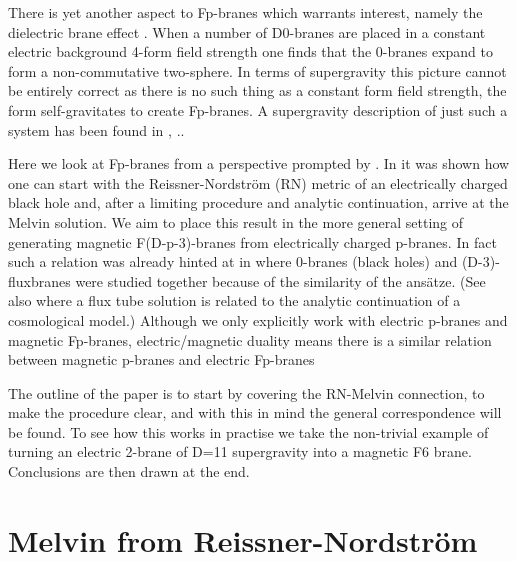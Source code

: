 \documentclass[a4paper,11pt]{article}
\begin{document}
There is yet another aspect to Fp-branes which warrants
interest, namely the dielectric brane effect \cite{myers99}. When
a number of D0-branes are placed in a constant electric
background 4-form field strength one finds that the 0-branes expand
to form a non-commutative two-sphere. In terms of supergravity this
picture cannot be entirely correct as there is no such thing as
a constant form field strength, the form self-gravitates to create
Fp-branes. A supergravity description of just such a system has been
found in \cite{emparan01}, \cite{herdeiro01}..

Here we look at Fp-branes from a perspective prompted by \cite{gibbons01}.
In \cite{gibbons01} it was shown how one can start
with the Reissner-Nordstr\"{o}m (RN) 
metric of an electrically charged
black hole and, after a limiting procedure and analytic
continuation, arrive at the Melvin solution.
We aim to place this result in the more general setting of generating
magnetic F(D-p-3)-branes from electrically charged p-branes.
In fact such a relation was already hinted at in \cite{gibbons88} where
0-branes (black holes) and (D-3)-fluxbranes were studied together because
of the similarity of the ans\"{a}tze.
(See also \cite{gibbons87} where a flux tube solution is related to the
analytic continuation of a cosmological model.)
 Although we only explicitly work
with electric p-branes and magnetic Fp-branes, electric/magnetic duality
means there is a similar relation between 
magnetic p-branes and electric Fp-branes

The outline of the paper is to start by covering the RN-Melvin connection,
to make the procedure clear, and with this in mind the general 
correspondence will be found. To see how this works in practise we take
the non-trivial example of turning an electric 2-brane of D=11 
supergravity
into a magnetic F6 brane. Conclusions are then drawn at the end.

\setcounter{equation}{0}
\section{Melvin from Reissner-Nordstr\"{o}m}
\end{document}
